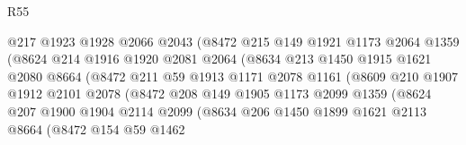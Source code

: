 \begin{lexlean}{R55}
\begin{coremodule}
                            @217
                            @1923
                            @1928
                            @2066
                            @2043
                            (@8472
                              @215
                              @149
                              @1921
                              @1173
                              @2064
                              @1359
                              (@8624
                                @214
                                @1916
                                @1920
                                @2081
                                @2064
                                (@8634
                                  @213
                                  @1450
                                  @1915
                                  @1621
                                  @2080
                                  @8664
                                  (@8472
                                    @211
                                    @59
                                    @1913
                                    @1171
                                    @2078
                                    @1161
                                    (@8609
                                      @210
                                      @1907
                                      @1912
                                      @2101
                                      @2078
                                      (@8472
                                        @208
                                        @149
                                        @1905
                                        @1173
                                        @2099
                                        @1359
                                        (@8624
                                          @207
                                          @1900
                                          @1904
                                          @2114
                                          @2099
                                          (@8634
                                            @206
                                            @1450
                                            @1899
                                            @1621
                                            @2113
                                            @8664
                                            (@8472
                                              @154
                                              @59
                                              @1462

\end{coremodule}
\end{lexlean}
